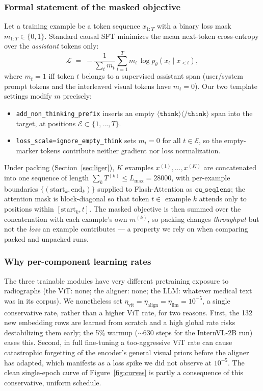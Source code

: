 \documentclass[11pt,a4paper]{article}
\begin{document}
\subsubsection{Formal statement of the masked objective}
Let a training example be a token sequence $x_{1:T}$ with a binary loss mask $m_{1:T}\in\{0,1\}$. Standard causal SFT minimizes the mean next-token cross-entropy over the \emph{assistant} tokens only:
\[
\mathcal{L} \;=\; -\frac{1}{\sum_t m_t}\sum_{t=1}^{T} m_t \,\log p_\theta\!\left(x_t \mid x_{<t}\right),
\]
where $m_t = 1$ iff token $t$ belongs to a supervised assistant span (user/system prompt tokens and the interleaved visual tokens have $m_t=0$). Our two template settings modify $m$ precisely:
\begin{itemize}[leftmargin=1.4em]
  \item \texttt{add\_non\_thinking\_prefix} inserts an empty $\langle\texttt{think}\rangle\langle/\texttt{think}\rangle$ span into the target, at positions $\mathcal{E}\subset\{1,\dots,T\}$.
  \item \texttt{loss\_scale=ignore\_empty\_think} sets $m_t = 0$ for all $t\in\mathcal{E}$, so the empty-marker tokens contribute neither gradient nor loss normalization.
\end{itemize}
Under packing (Section~\ref{sec:liger}), $K$ examples $x^{(1)},\dots,x^{(K)}$ are concatenated into one sequence of length $\sum_k T^{(k)} \le L_{\max}=28000$, with per-example boundaries $\{(\text{start}_k,\text{end}_k)\}$ supplied to Flash-Attention as $\texttt{cu\_seqlens}$; the attention mask is block-diagonal so that token $t\in$ example $k$ attends only to positions within $[\text{start}_k, t]$. The masked objective is then summed over the concatenation with each example's own $m^{(k)}$, so packing changes \emph{throughput} but not the \emph{loss} an example contributes --- a property we rely on when comparing packed and unpacked runs.

\subsubsection{Why per-component learning rates}
The three trainable modules have very different pretraining exposure to radiographs (the ViT: none; the aligner: none; the LLM: whatever medical text was in its corpus). We nonetheless set $\eta_{\text{vit}}=\eta_{\text{align}}=\eta_{\text{llm}}=10^{-5}$, a single conservative rate, rather than a higher ViT rate, for two reasons. First, the 132 new embedding rows are learned from scratch and a high global rate risks destabilizing them early; the 5\% warmup ($\sim$630 steps for the InternVL-2B run) eases this. Second, in full fine-tuning a too-aggressive ViT rate can cause catastrophic forgetting of the encoder's general visual priors before the aligner has adapted, which manifests as a loss spike we did not observe at $10^{-5}$. The clean single-epoch curve of Figure~\ref{fig:curves} is partly a consequence of this conservative, uniform schedule.
\end{document}
